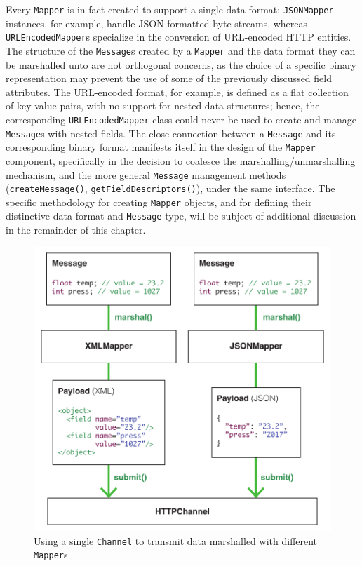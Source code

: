 Every \texttt{Mapper} is in fact created to support a single data format;
\texttt{JSONMapper} instances, for example, handle JSON-formatted byte streams,
whereas \texttt{URLEncodedMapper}s specialize in the conversion of URL-encoded
HTTP entities. The structure of the \texttt{Message}s created by a
\texttt{Mapper} and the data format they can be marshalled unto are not
orthogonal concerns, as the choice of a specific binary representation may
prevent the use of some of the previously discussed field attributes. The
URL-encoded format, for example, is defined as a flat collection of key-value
pairs, with no support for nested data structures; hence, the corresponding
\texttt{URLEncodedMapper} class could never be used to create and manage
\texttt{Message}s with nested fields. The close connection between a
\texttt{Message} and its corresponding binary format manifests itself in the
design of the \texttt{Mapper} component, specifically in the decision to
coalesce the marshalling/unmarshalling mechanism, and the more general
\texttt{Message} management methods (\texttt{createMessage()},
\texttt{getFieldDescriptors()}), under the same interface. The specific
methodology for creating \texttt{Mapper} objects, and for defining their
distinctive data format and \texttt{Message} type, will be subject of
additional discussion in the remainder of this chapter.

\begin{figure}[h!]
    \centering
    \includegraphics[scale=0.8]{imgs/mapper_channel.pdf}
    \caption{Using a single \texttt{Channel} to transmit data marshalled with
    different \texttt{Mapper}s}
    \label{fig:mapper_channel}
\end{figure}

